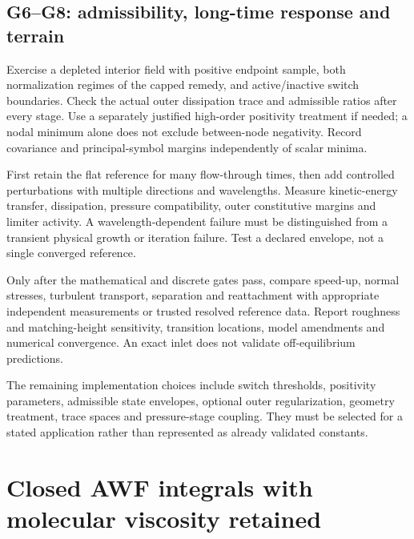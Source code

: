 \documentclass[11pt,a4paper]{article}
\numberwithin{equation}{section}
\begin{document}
\subsection{G6--G8: admissibility, long-time response and terrain}
\begin{description}[style=nextline,leftmargin=2.6em]
\item[G6: positivity and admissibility.]
Exercise a depleted interior field with positive endpoint sample, both
normalization regimes of the capped remedy, and active/inactive switch
boundaries. Check the actual outer dissipation trace and admissible
ratios after every stage. Use a separately justified high-order
positivity treatment if needed; a nodal minimum alone does not exclude
between-node negativity. Record covariance and principal-symbol
margins independently of scalar minima.
\item[G7: long-time and perturbation tests.]
First retain the flat reference for many flow-through times, then add
controlled perturbations with multiple directions and wavelengths.
Measure kinetic-energy transfer, dissipation, pressure compatibility,
outer constitutive margins and limiter activity. A wavelength-dependent
failure must be distinguished from a transient physical growth or
iteration failure. Test a declared envelope, not a single converged
reference.
\item[G8: physical terrain validation.]
Only after the mathematical and discrete gates pass, compare speed-up,
normal stresses, turbulent transport, separation and reattachment with
appropriate independent measurements or trusted resolved reference
data. Report roughness and matching-height sensitivity, transition
locations, model amendments and numerical convergence. An exact inlet
does not validate off-equilibrium predictions.
\end{description}

The remaining implementation choices include switch thresholds,
positivity parameters, admissible state envelopes, optional outer
regularization, geometry treatment, trace spaces and pressure-stage
coupling. They must be selected for a stated application rather than
represented as already validated constants.

\appendix
\section{Closed AWF integrals with molecular viscosity retained}
\label{app:integrals}
\end{document}

